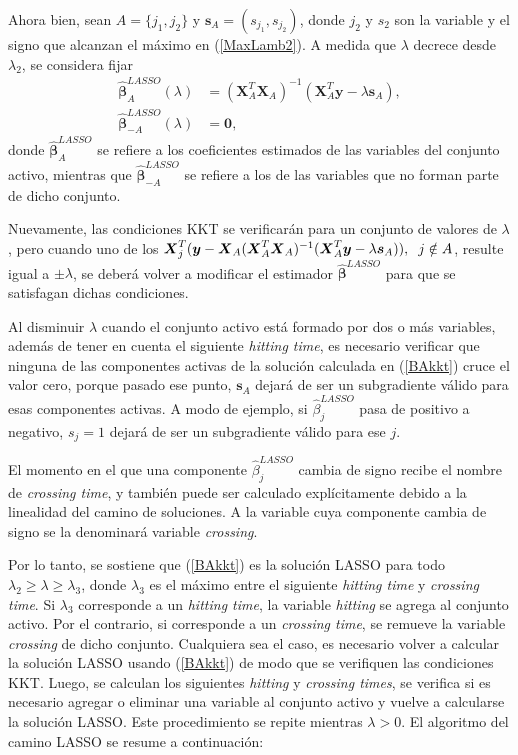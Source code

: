 \documentclass[a4paper,12pt]{report}
\begin{document}
Ahora bien, sean $A=\{j_1,j_2\}$ y $\boldsymbol{s}_A=(s_{j_1},s_{j_2})$, donde $j_2$ y $s_2$ son la variable y el signo que alcanzan el máximo en (\ref{MaxLamb2}). A medida que $\lambda$ decrece desde $\lambda_2$, se considera fijar
\begin{equation}
\label{BAkkt}
\begin{aligned}
\boldsymbol{\hat{\beta}}_A^{LASSO}(\lambda)&=(\boldsymbol{X}_A^T\boldsymbol{X}_A)^{-1}(\boldsymbol{X}_A^T\boldsymbol{y}-\lambda \boldsymbol{s}_A), \\ \boldsymbol{\hat{\beta}}_{-A}^{LASSO}(\lambda)&=\boldsymbol{0},
\end{aligned}
\end{equation}
donde $\boldsymbol{\hat{\beta}}_A^{LASSO}$ se refiere a los coeficientes estimados de las variables del conjunto activo, mientras que $\boldsymbol{\hat{\beta}}_{-A}^{LASSO}$ se refiere a los de las variables que no forman parte de dicho conjunto.

Nuevamente, las condiciones KKT se verificarán para un conjunto de valores de $\lambda$, pero cuando uno de los $\boldsymbol{X}_j^T(\boldsymbol{y}-\boldsymbol{X}_A(\boldsymbol{X}_A^T\boldsymbol{X}_A)^{-1}(\boldsymbol{X}_A^T\boldsymbol{y}-\lambda \boldsymbol{s}_A)), \hspace{0.2cm} j \notin A$, resulte igual a $\pm \lambda$, se deberá volver a modificar el estimador $\boldsymbol{\hat{\beta}}^{LASSO}$ para que se satisfagan dichas condiciones.

Al disminuir $\lambda$ cuando el conjunto activo está formado por dos o más variables, además de tener en cuenta el siguiente \textit{hitting time}, es necesario verificar que ninguna de las componentes activas de la solución calculada en (\ref{BAkkt}) cruce el valor cero, porque pasado ese punto, $\boldsymbol{s}_A$ dejará de ser un subgradiente válido para esas componentes activas. A modo de ejemplo, si $\hat{\beta}_{j}^{LASSO}$ pasa de positivo a negativo, $s_j=1$ dejará de ser un subgradiente válido para ese $j$.

El momento en el que una componente $\hat{\beta}_j^{LASSO}$ cambia de signo recibe el nombre de \textit{crossing time}, y también puede ser calculado explícitamente debido a la linealidad del camino de soluciones. A la variable cuya componente cambia de signo se la denominará variable \textit{crossing}. 

Por lo tanto, se sostiene que (\ref{BAkkt}) es la solución LASSO para todo $\lambda_2 \geq \lambda \geq \lambda_3$, donde $\lambda_3$ es el máximo entre el siguiente \textit{hitting time} y \textit{crossing time}. Si $\lambda_3$ corresponde a un \textit{hitting time}, la variable \textit{hitting} se agrega al conjunto activo. Por el contrario, si corresponde a un \textit{crossing time}, se remueve la variable \textit{crossing} de dicho conjunto. Cualquiera sea el caso, es necesario volver a calcular la solución LASSO usando (\ref{BAkkt}) de modo que se verifiquen las condiciones KKT. Luego, se calculan los siguientes \textit{hitting} y \textit{crossing times}, se verifica si es necesario agregar o eliminar una variable al conjunto activo y vuelve a calcularse la solución LASSO. Este procedimiento se repite mientras $\lambda > 0$. El algoritmo del camino LASSO se resume a continuación:
\end{document}
